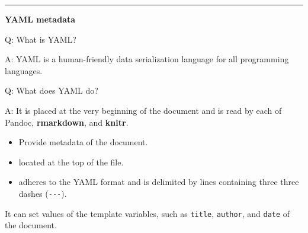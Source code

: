 \documentclass[
]{book}
\providecommand{\tightlist}{%
  \setlength{\itemsep}{0pt}\setlength{\parskip}{0pt}}
\begin{document}
\begin{center}\rule{0.5\linewidth}{0.5pt}\end{center}

\textbf{YAML metadata}

Q: What is YAML?

A: YAML is a human-friendly data serialization language for all programming languages.

Q: What does YAML do?

A: It is placed at the very beginning of the document and is read by each of Pandoc, \textbf{rmarkdown}, and \textbf{knitr}.

\begin{itemize}
\tightlist
\item
  Provide metadata of the document.
\item
  located at the top of the file.
\item
  adheres to the YAML format and is delimited by lines containing three three dashes (\texttt{-\/-\/-}).
\end{itemize}

It can set values of the template variables, such as \texttt{title}, \texttt{author}, and \texttt{date} of the document.
\end{document}

